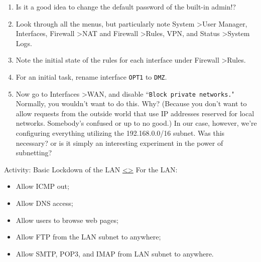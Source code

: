 \documentclass[12pt]{extarticle}
\newenvironment{instructionblock}{\Large\bgroup}{\egroup}
\begin{document}
\vspace{8mm}
\begin{enumerate}
\item Is it a good idea to change the default password of the built-in admin!?
\item Look through all the menus, but particularly note System \textgreater User Manager, Interfaces, Firewall \textgreater NAT and Firewall \textgreater Rules, VPN, and Status \textgreater System Logs.
\item Note the initial state of the rules for each interface under Firewall \textgreater Rules.
\item For an initial task, rename interface \texttt{OPT1} to \texttt{DMZ}.
\item Now go to Interfaces \textgreater WAN, and disable ``\texttt{Block private networks.}" Normally, you wouldn't want to do this. Why? (Because you don't want to allow requests from the outside world that use IP addresses reserved for local networks. Somebody's confused or up to no good.) In our case, however, we're configuring everything utilizing the 192.168.0.0/16 subnet. Was this necessary? or is it simply an interesting experiment in the power of subnetting?
\end{enumerate}








\pagebreak
\begin{slide}{ Activity: Basic Lockdown of the LAN }{ \hyperref[slide 11]{\textless}\hyperref[slide 13]{\textgreater} }
\vskip 5pt
\begin{instructionblock}
    For the LAN:
    \begin{itemize}
        \item Allow ICMP out;
        \item Allow DNS access;
        \item Allow users to browse web pages;
        \item Allow FTP from the LAN subnet to anywhere;
        \item Allow SMTP, POP3, and IMAP from LAN subnet to anywhere.
    \end{itemize}
\end{instructionblock}
\end{slide}


\vspace{8mm}
\noindent
\end{document}
